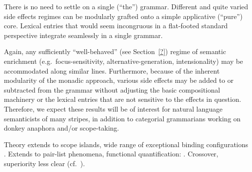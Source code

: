 	There is no need to settle on a single (``the'') grammar. Different and quite varied side effects regimes can be modularly grafted onto a simple applicative (``pure'') core. Lexical entries that would seem incongruous in a flat-footed standard perspective integrate seamlessly in a single grammar. %
	
	Again, any sufficiently ``well-behaved'' (see Section~\ref{?}) regime of semantic enrichment (e.g.~focus-sensitivity, alternative-generation, intensionality) may be accommodated along similar lines. Furthermore, because of the inherent modularity of the monadic approach, various side effects may be added to or subtracted from the grammar without adjusting the basic compositional machinery or the lexical entries that are not sensitive to the effects in question. Therefore, we expect these results will be of interest for natural language semanticists of many stripes, in addition to categorial grammarians working on donkey anaphora and/or scope-taking. %
	
	Theory extends to scope islands, wide range of exceptional binding configurations \citealt{Charlow:diss}. Extends to pair-list phenomena, functional quantification: \citealt{Bumford:inc}. Crossover, superiority less clear (cf.~\citealt{ShanBarker:2006, BarkerShan:2008}). %

{\small}

